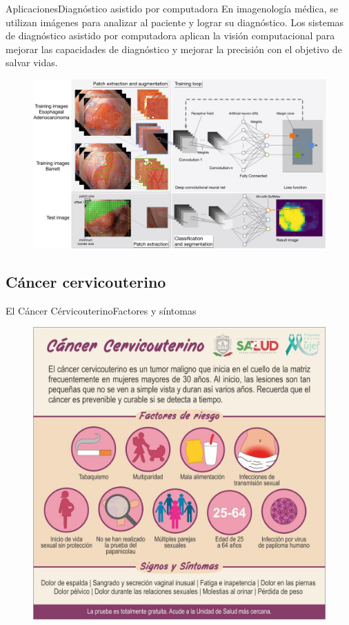 \documentclass[aspectratio=169,10pt]{beamer}
\begin{document}
\begin{frame}{Aplicaciones}{Diagnóstico asistido por computadora}
  En imagenología médica, se utilizan imágenes para analizar al paciente y lograr su diagnóstico. Los sistemas de diagnóstico asistido por computadora aplican la visión computacional para mejorar las capacidades de diagnóstico y mejorar la precisión con el objetivo de salvar vidas.
  \begin{figure}[]
    \centering
    \includegraphics[height=0.70\textheight]{cad.jpg}
  \end{figure}
\end{frame}



\subsection{Cáncer cervicouterino}

\begin{frame}{El Cáncer Cérvicouterino}{Factores y síntomas}
  \begin{figure}[]
    \centering
    \includegraphics[height=0.95\textheight]{secretaria}
  \end{figure}
\end{frame}
\end{document}
